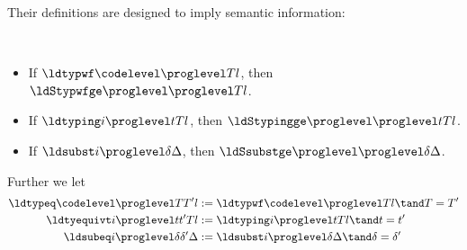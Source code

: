 Their definitions are designed to imply semantic information:
\begin{lemma} $ $
  \begin{itemize}
  \item If $\ldtypwf \codelevel \proglevel T l$, then $\ldStypwfge \proglevel \proglevel T l$.
  \item If $\ldtyping i \proglevel t T l$, then $\ldStypingge \proglevel \proglevel t T l$.
  \item If $\ldsubst i \proglevel \delta \Delta$, then $\ldSsubstge \proglevel \proglevel \delta \Delta$.
  \end{itemize}
\end{lemma}
Further we let
\begin{align*}
  \ldtypeq \codelevel \proglevel T{T'} l &:= \ldtypwf \codelevel \proglevel T l \tand T = T' \\
  \ldtyequivt i \proglevel t{t'} T l & := \ldtyping i \proglevel t T l \tand t = t' \\
  \ldsubeq i \proglevel \delta{\delta'}{\Delta} &:= \ldsubst i \proglevel \delta{\Delta} \tand \delta = \delta'
\end{align*}

